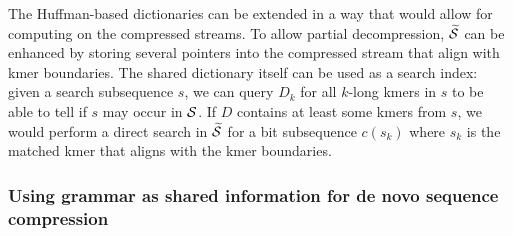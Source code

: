 \documentclass[12pt]{cmuthesis}
\begin{document}

  The Huffman-based dictionaries can be extended in a way that would allow for computing on the compressed streams. To allow partial decompression, $\widetilde{\mathcal{S}}$ can be enhanced by storing several pointers into the compressed stream that align with kmer boundaries. The shared dictionary itself can be used as a search index: given a search subsequence $s$, we can query $D_k$ for all $k$-long kmers in $s$ to be able to tell if $s$ may occur in $\mathcal{S}$. If $D$ contains at least some kmers from $s$, we would perform a direct search in $\widetilde{\mathcal{S}}$ for a bit subsequence $c(s_k)$ where $s_k$ is the matched kmer that aligns with the kmer boundaries.

  \subsubsection{Using grammar as shared information for de novo sequence compression}
\end{document}
